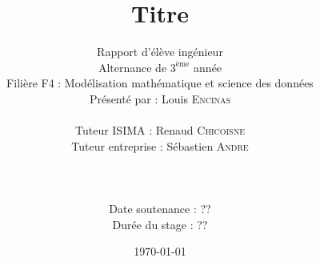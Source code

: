 



\title{\Huge{Titre}}
\author{Rapport d'élève ingénieur\\
Alternance de $3^{\text{ème}}$ année\\
Filière F4 : Modélisation mathématique et science des données\\
Présenté par : Louis \textsc{Encinas}\\\\
Tuteur ISIMA : Renaud \textsc{Chicoisne}\\
Tuteur entreprise : Sébastien \textsc{Andre}\\\\\\\\
Date soutenance : ??\\
Durée du stage : ??}
\date{\today}



\begin{titlepage}
\maketitle
\end{titlepage}

\shipout\null



\newpage


\newpage

\tableofcontents
{}
\newpage

